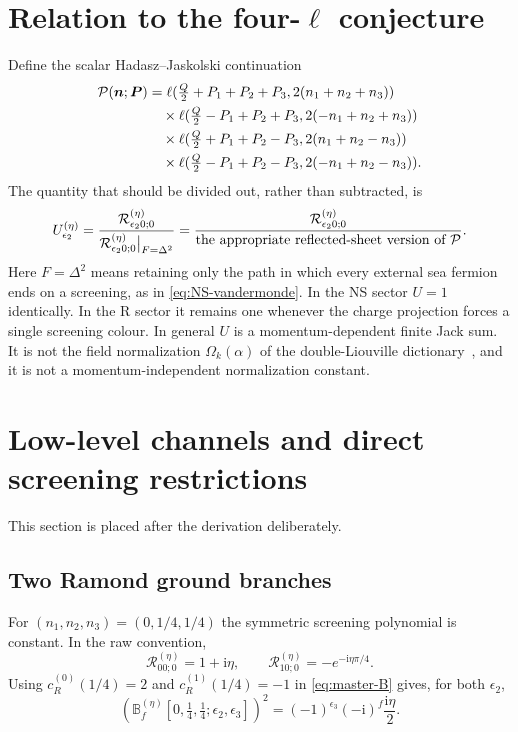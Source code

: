 \documentclass[11pt]{article}
\newcommand{\cR}{\mathcal R}
\newcommand{\eps}{\epsilon}
\newcommand{\ii}{\mathrm i}
\begin{document}
\section{Relation to the four-\texorpdfstring{$\ell$}{ell} conjecture}

Define the scalar Hadasz--Jaskolski continuation
\begin{align}
 \mathcal P(\boldsymbol n;\boldsymbol P)
 &=\ell(\tfrac Q2+P_1+P_2+P_3,2(n_1+n_2+n_3))\notag\\
 &\quad\times\ell(\tfrac Q2-P_1+P_2+P_3,2(-n_1+n_2+n_3))\notag\\
 &\quad\times\ell(\tfrac Q2+P_1+P_2-P_3,2(n_1+n_2-n_3))\notag\\
 &\quad\times\ell(\tfrac Q2-P_1+P_2-P_3,2(-n_1+n_2-n_3)).
 \label{eq:Pcal}
\end{align}
The quantity that should be divided out, rather than subtracted, is
\begin{equation}
 U_{\eps_2}^{(\eta)}
 =\frac{\cR_{\eps_2 0;0}^{(\eta)}}
 {\cR_{\eps_2 0;0}^{(\eta)}\big|_{F=\Delta^2}}
 =\frac{\cR_{\eps_2 0;0}^{(\eta)}}
 {\hbox{the appropriate reflected-sheet version of }\mathcal P}.
 \label{eq:Ufactor}
\end{equation}
Here $F=\Delta^2$ means retaining only the path in which every external sea
fermion ends on a screening, as in \eqref{eq:NS-vandermonde}.  In the NS sector $U=1$
identically.  In the R sector it remains one whenever the charge projection
forces a single screening colour.  In general $U$ is a momentum-dependent
finite Jack sum.  It is not the field normalization $\Omega_k(\alpha)$ of
the double-Liouville dictionary~\cite{SS}, and it is not a
momentum-independent normalization constant.

\section{Low-level channels and direct screening restrictions}
\label{sec:low}

This section is placed after the derivation deliberately.

\subsection{Two Ramond ground branches}

For $(n_1,n_2,n_3)=(0,1/4,1/4)$ the symmetric screening polynomial is
constant.  In the raw convention,
\begin{equation}
 \cR_{00;0}^{(\eta)}=1+\ii\eta,\qquad
 \cR_{10;0}^{(\eta)}=-e^{-\ii\eta\pi/4}.
 \label{eq:ground-R}
\end{equation}
Using $c_R^{(0)}(1/4)=2$ and $c_R^{(1)}(1/4)=-1$ in
\eqref{eq:master-B} gives, for both $\eps_2$,
\begin{equation}
 \left(\mathbb B_f^{(\eta)}[0,\tfrac14,\tfrac14;
 \eps_2,\eps_3]\right)^2
 =(-1)^{\eps_3}(-\ii)^f\frac{\ii\eta}{2}.
 \label{eq:ground-B}
\end{equation}
\end{document}
